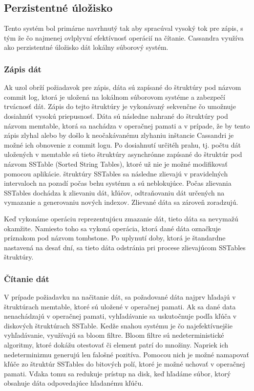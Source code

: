 \documentclass[11pt,twoside,a4paper]{book}
\begin{document}
\subsection{Perzistentné úložisko}

Tento systém bol primárne navrhnutý tak aby spracúval vysoký tok pre zápis, s tým že čo najmenej ovlplyvní efektívnosť operácií na čítanie. Cassandra využíva ako perzistentné úložisko dát lokálny súborový systém. 

\subsubsection{Zápis dát}
Ak uzol obrží požiadavok pre zápis, dáta sú zapísané do štruktúry pod názvom commit log, ktorá je uložená na lokálnom súborovom systéme a zabezpečí trvácnosť dát. Zápis do tejto štruktúry je vykonávaný sekvenčne čo umožnuje dosiahnúť vysokú priepusnosť. Dáta sú následne nahrané do štruktúry pod názvom memtable, ktorá sa nachádza v operačnej pamati a v prípade, že by tento zápis zlyhal alebo by došlo k neočakávanému zlyhaniu inštancie Cassandri je možné ich obnovenie z commit logu. 
Po dosiahnutí určitéh prahu, tj. počtu dát uložených v memtable sú tieto štruktúry asynchrónne zapísané do štruktúr pod názvom SSTable (Sorted String Tables), ktoré už nie je možné modifikovať pomocou aplikácie. štruktúry SSTables sa následne zlievajú v pravidelných intervaloch na pozadí počas behu systému a sú neblokujúce. Počas zlievania SSTables dochádza k zlievaniu dát, kľúčov, odtraňovaniu dát určených na vymazanie a generovaniu nových indexov. Zlievané dáta sa zároveň zoradzujú. 


Keď vykonáme operáciu reprezentujúcu zmazanie dát, tieto dáta sa nevymažú okamžite. Namiesto toho sa vykoná operácia, ktorá dané dáta označkuje príznakom pod názvom tombstone. Po uplynutí doby, ktorá je štandardne nastavená na desať dní, sa tieto dáta odstránia pri procese zlievajúcom SSTables štruktúry.

\subsubsection{Čítanie dát}
V prípade požiadavku na načitanie dát, sa požadované dáta najprv hľadajú v štruktúrach memtable, ktoré sú uložené v operačnej pamati. Ak sa dané data nenachádzajú v operačnej pamati, vyhľadávanie sa uskutočnuje podľa kľúča v diskových štruktúrach SSTable. Kedže snahou systému je čo najefektívnejšie vyhľadávanie, využívajú sa bloom filtre. Bloom filtre sú nedeterministické algoritmy, ktoré dokážu otestovať či element patrí do množiny. Napriek ich nedeterminizmu generujú len falošné pozitíva. Pomocou nich je možné namapovať kľúče zo štruktúr SSTables do bitových polí, ktoré je možné uchovať v operačnej pamati. Vďaka tomu sa redukuje prístup na disk, keď hľadáme súbor, ktorý obsahuje dáta odpovedajúce hľadanému kľúču. 
\end{document}
